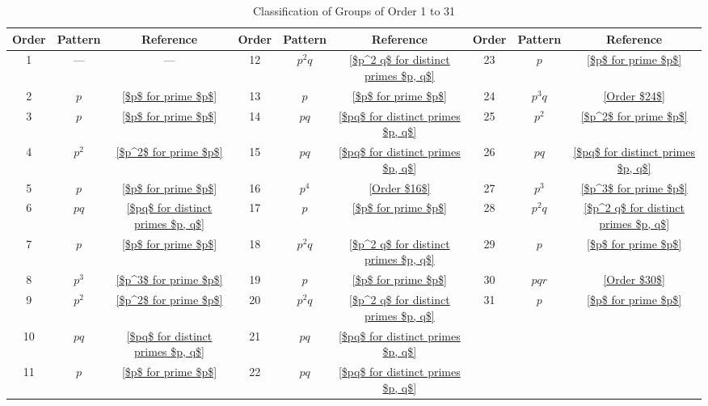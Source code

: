 \begin{table}[htbp]
\centering
\caption{Classification of Groups of Order 1 to 31}
\label{tab:groups_1_31_clean}
\small
\begin{tabular}{ccc | ccc | ccc}
\hline
Order & Pattern & Reference & Order & Pattern & Reference & Order & Pattern & Reference \\
\hline
1  & —      & —                                      & 12 & $p^2 q$ & \ref{$p^2 q$ for distinct primes $p, q$} & 23 & $p$     & \ref{$p$ for prime $p$} \\
2  & $p$    & \ref{$p$ for prime $p$}                & 13 & $p$     & \ref{$p$ for prime $p$}                & 24 & $p^3 q$ & \ref{Order $24$} \\
3  & $p$    & \ref{$p$ for prime $p$}                & 14 & $pq$    & \ref{$pq$ for distinct primes $p, q$}  & 25 & $p^2$   & \ref{$p^2$ for prime $p$} \\
4  & $p^2$  & \ref{$p^2$ for prime $p$}              & 15 & $pq$    & \ref{$pq$ for distinct primes $p, q$}  & 26 & $pq$    & \ref{$pq$ for distinct primes $p, q$} \\
5  & $p$    & \ref{$p$ for prime $p$}                & 16 & $p^4$   & \ref{Order $16$}                       & 27 & $p^3$   & \ref{$p^3$ for prime $p$} \\
6  & $pq$   & \ref{$pq$ for distinct primes $p, q$}  & 17 & $p$     & \ref{$p$ for prime $p$}                & 28 & $p^2 q$ & \ref{$p^2 q$ for distinct primes $p, q$} \\
7  & $p$    & \ref{$p$ for prime $p$}                & 18 & $p^2 q$ & \ref{$p^2 q$ for distinct primes $p, q$} & 29 & $p$     & \ref{$p$ for prime $p$} \\
8  & $p^3$  & \ref{$p^3$ for prime $p$}              & 19 & $p$     & \ref{$p$ for prime $p$}                & 30 & $p q r$ & \ref{Order $30$} \\
9  & $p^2$  & \ref{$p^2$ for prime $p$}              & 20 & $p^2 q$ & \ref{$p^2 q$ for distinct primes $p, q$} & 31 & $p$     & \ref{$p$ for prime $p$} \\
10 & $pq$   & \ref{$pq$ for distinct primes $p, q$}  & 21 & $pq$    & \ref{$pq$ for distinct primes $p, q$}  &    &         & \\
11 & $p$    & \ref{$p$ for prime $p$}                & 22 & $pq$    & \ref{$pq$ for distinct primes $p, q$}  &    &         & \\
\hline
\end{tabular}
\end{table}

